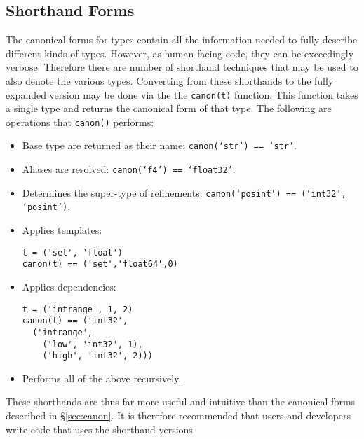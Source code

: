 \documentclass{ansconfpaper}
\newcommand{\vin}[1]{\texttt{{#1}}}
\begin{document}
\subsection{Shorthand Forms}
\label{sec:shorhand}

The canonical forms for types contain all the information needed to fully describe
different kinds of types.  However, as human-facing code, they can be exceedingly 
verbose.  Therefore there are number of shorthand techniques that may be used to 
also denote the various types.  Converting from these shorthands to the fully
expanded version may be done via the the \vin{canon(t)} function.  This function
takes a single type and returns the canonical form of that type.  The following
are operations that \vin{canon()}  performs:

\begin{itemize}
\item Base type are returned as their name: \vin{canon(`str') == `str'}.

\item Aliases are resolved: \vin{canon(`f4') == `float32'}.

\item Determines the super-type of refinements: \vin{canon(`posint') == 
    (`int32', `posint')}.

\item Applies templates:
\begin{lstlisting}
t = ('set', 'float')
canon(t) == ('set','float64',0)
\end{lstlisting}

\item Applies dependencies:
\begin{lstlisting}    
t = ('intrange', 1, 2)
canon(t) == ('int32', 
  ('intrange', 
    ('low', 'int32', 1), 
    ('high', 'int32', 2)))
\end{lstlisting}

\item Performs all of the above recursively.
\end{itemize}

These shorthands are thus far more useful and intuitive than the canonical forms 
described in \S \ref{sec:canon}.  It is therefore recommended that users and 
developers write code that uses the shorthand versions.
\end{document}
